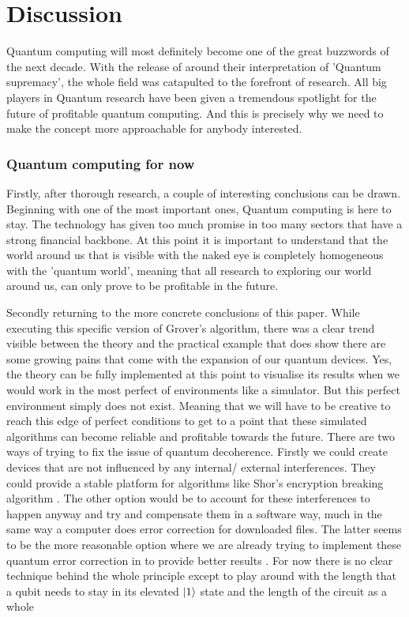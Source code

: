
\chapter{Discussion}
\label{ch:conclusie}

Quantum computing will most definitely become one of the great buzzwords of the next decade. With the release of \textcite{Google2019} around their interpretation of 'Quantum supremacy', the whole field was catapulted to the forefront of research. All big players in Quantum research have been given a tremendous spotlight for the future of profitable quantum computing. And this is precisely why we need to make the concept more approachable for anybody interested.

\subsection{Quantum computing for now}

Firstly, after thorough research, a couple of interesting conclusions can be drawn. Beginning with one of the most important ones, Quantum computing is here to stay. The technology has given too much promise in too many sectors that have a strong financial backbone. At this point it is important to understand that the world around us that is visible with the naked eye is completely homogeneous with the 'quantum world', meaning that all research to exploring our world around us, can only prove to be profitable in the future.

Secondly returning to the more concrete conclusions of this paper. While executing this specific version of Grover's algorithm, there was a clear trend visible between the theory and the practical example that does show there are some growing pains that come with the expansion of our quantum devices.
Yes, the theory can be fully implemented at this point to visualise its results when we would work in the most perfect of environments like a simulator. But this perfect environment simply does not exist. Meaning that we will have to be creative to reach this edge of perfect conditions to get to a point that these simulated algorithms can become reliable and profitable towards the future. There are two ways of trying to fix the issue of quantum decoherence. Firstly we could create devices that are not influenced by any internal/ external interferences. They could provide a stable platform for algorithms like Shor's encryption breaking algorithm \textcite{gidney2019factor}. The other option would be to account for these interferences to happen anyway and try and compensate them in a software way, much in the same way a computer does error correction for downloaded files. The latter seems to be the more reasonable option where we are already trying to implement these quantum error correction in to provide better results \autocite{Cory1998}. For now there is no clear technique behind the whole principle except to play around with the length that a qubit needs to stay in its elevated $\ket{1}$ state and the length of the circuit as a whole

